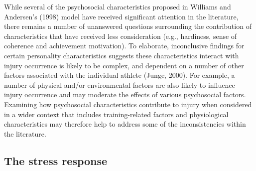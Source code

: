 \documentclass[man,floatsintext]{apa6}
\begin{document}
While several of the psychosocial characteristics proposed in Williams and Andersen's (1998) model have received significant attention in the literature, there remains a number of unanswered questions surrounding the contribution of characteristics that have received less consideration (e.g., hardiness, sense of coherence and achievement motivation).
To elaborate, inconclusive findings for certain personality characteristics suggests these characteristics interact with injury occurrence is likely to be complex, and dependent on a number of other factors associated with the individual athlete (Junge, 2000). For example, a number of physical and/or environmental factors are also likely to influence injury occurrence and may moderate the effects of various psychosocial factors.
Examining how psychosocial characteristics contribute to injury when considered in a wider context that includes training-related factors and physiological characteristics may therefore help to address some of the inconsistencies within the literature.

\hypertarget{the-stress-response}{%
\subsection{The stress response}\label{the-stress-response}}
\end{document}
